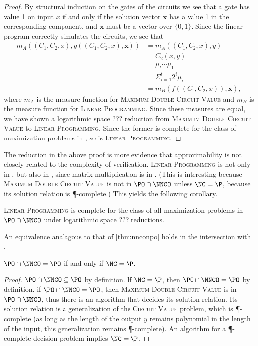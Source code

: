 \documentclass[]{article}
\begin{document}
\begin{proof}
  By structural induction on the gates of the circuits we see that a gate has value 1 on input $x$ if and only if the solution vector $\mathbf{x}$ has a value 1 in the corresponding component, and $\mathbf{x}$ must be a vector over $\{0, 1\}$.
  Since the linear program correctly simulates the circuits, we see that
  \begin{align*}
    m_A((C_1, C_2, x), g((C_1, C_2, x), \mathbf{x})) & = m_A((C_1, C_2, x), y) \\
    & = C_2(x, y) \\
    & = \mu_t \dotsb \mu_1 \\
    & = \Sigma^t_{i = 1} 2^i \mu_i \\
    & = m_B(f((C_1, C_2, x)), \mathbf{x}),
  \end{align*}
  where $m_A$ is the measure function for \textsc{Maximum Double Circuit Value} and $m_B$ is the measure function for \textsc{Linear Programming}.
  Since these measures are equal, we have shown a logarithmic space ??? reduction from \textsc{Maximum Double Circuit Value} to \textsc{Linear Programming}.
  Since the former is complete for the class of maximization problems in \PO, so is \textsc{Linear Programming}.
\end{proof}

The reduction in the above proof is more evidence that approximability is not closely related to the complexity of verification.
\textsc{Linear Programming} is not only in \PO, but also in \NNCO, since matrix multiplication is in \NC.
(This is interesting because \textsc{Maximum Double Circuit Value} is not in $\PO \cap \NNCO$ unless $\NC = \P$, because its solution relation is \P-complete.)
This yields the following corollary.

\begin{corollary}\label{cor:lpishard}
  \textsc{Linear Programming} is complete for the class of all maximization problems in $\PO \cap \NNCO$ under logarithmic space ??? reductions.
\end{corollary}

An equivalence analagous to that of \autoref{thm:nnconpo} holds in the intersection with \PO.

\begin{theorem}\label{thm:poppo}
  $\PO \cap \NNCO = \PO$ if and only if $\NC = \P$.
\end{theorem}
\begin{proof}
  $\PO \cap \NNCO \subseteq \PO$ by definition.
  If $\NC = \P$, then $\PO \cap \NNCO = \PO$ by definition.
  if $\PO \cap \NNCO = \PO$, then \textsc{Maximum Double Circuit Value} is in $\PO \cap \NNCO$, thus there is an \NC{} algorithm that decides its solution relation.
  Its solution relation is a generalization of the \textsc{Circuit Value} problem, which is \P-complete (as long as the length of the output $y$ remains polynomial in the length of the input, this generalization remains \P-complete).
  An \NC{} algorithm for a \P-complete decision problem implies $\NC = \P$.
\end{proof}
\end{document}
